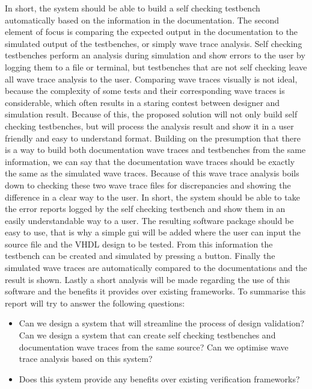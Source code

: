\npar
In short, the system should be able to build a self checking testbench automatically based on the information in the documentation.
\npar
The second element of focus is comparing the expected output in the documentation to the simulated output of the testbenches, or simply wave trace analysis. Self checking testbenches perform an analysis during simulation and show errors to the user by logging them to a file or terminal, but testbenches that are not self checking leave all wave trace analysis to the user. Comparing wave traces visually is not ideal, because the complexity of some tests and their corresponding wave traces is considerable, which often results in a staring contest between designer and simulation result. Because of this, the proposed solution will not only build self checking testbenches, but will process the analysis result and show it in a user friendly and easy to understand format. Building on the presumption that there is a way to build both documentation wave traces and testbenches from the same information, we can say that the documentation wave traces should be exactly the same as the simulated wave traces. Because of this wave trace analysis boils down to checking these two wave trace files for discrepancies and showing the difference in a clear way to the user.
\npar
In short, the system should be able to take the error reports logged by the self checking testbench and show them in an easily understandable way to a user.
\npar
The resulting software package should be easy to use, that is why a simple gui will be added where the user can input the source file and the VHDL design to be tested. From this information the testbench can be created and simulated by pressing a button. Finally the simulated wave traces are automatically compared to the documentations and the result is shown.
\npar
Lastly a short analysis will be made regarding the use of this software and the benefits it provides over existing frameworks.
\npar
To summarise this report will try to answer the following questions:
\begin{itemize}
	\item Can we design a system that will streamline the process of design validation?
	\subitem Can we design a system that can create self checking testbenches and documentation wave traces from the same source?
	\subitem Can we optimise wave trace analysis based on this system?
	\item Does this system provide any benefits over existing verification frameworks?	
\end{itemize}